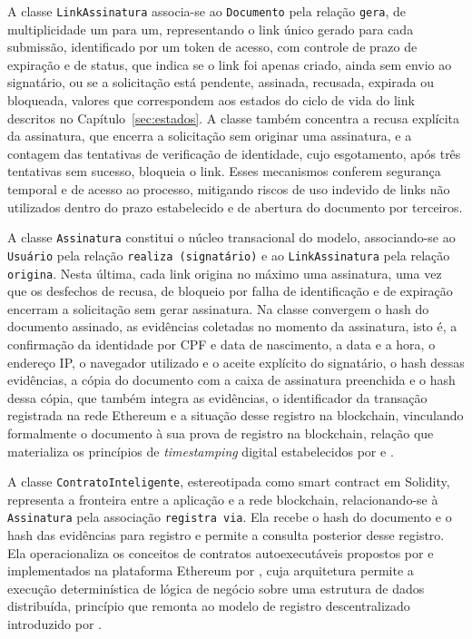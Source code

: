 \documentclass[
    12pt,
    a4paper,
    oneside,
    chapter=TITLE,
    section=TITLE,
    subsection=TITLE,
    subsubsection=TITLE,
    sumario=tradicional,
    english,
    brazil
]{abntex2}
\newcommand{\elem}[1]{\texttt{#1}}
\begin{document}
A classe \elem{LinkAssinatura} associa-se ao \elem{Documento} pela relação \elem{gera}, de multiplicidade um para um, representando o link único gerado para cada submissão, identificado por um token de acesso, com controle de prazo de expiração e de status, que indica se o link foi apenas criado, ainda sem envio ao signatário, ou se a solicitação está pendente, assinada, recusada, expirada ou bloqueada, valores que correspondem aos estados do ciclo de vida do link descritos no Capítulo~\ref{sec:estados}. A classe também concentra a recusa explícita da assinatura, que encerra a solicitação sem originar uma assinatura, e a contagem das tentativas de verificação de identidade, cujo esgotamento, após três tentativas sem sucesso, bloqueia o link. Esses mecanismos conferem segurança temporal e de acesso ao processo, mitigando riscos de uso indevido de links não utilizados dentro do prazo estabelecido e de abertura do documento por terceiros.

A classe \elem{Assinatura} constitui o núcleo transacional do modelo, associando-se ao \elem{Usuário} pela relação \elem{realiza (signatário)} e ao \elem{LinkAssinatura} pela relação \elem{origina}. Nesta última, cada link origina no máximo uma assinatura, uma vez que os desfechos de recusa, de bloqueio por falha de identificação e de expiração encerram a solicitação sem gerar assinatura. Na classe convergem o hash do documento assinado, as evidências coletadas no momento da assinatura, isto é, a confirmação da identidade por CPF e data de nascimento, a data e a hora, o endereço IP, o navegador utilizado e o aceite explícito do signatário, o hash dessas evidências, a cópia do documento com a caixa de assinatura preenchida e o hash dessa cópia, que também integra as evidências, o identificador da transação registrada na rede Ethereum e a situação desse registro na blockchain, vinculando formalmente o documento à sua prova de registro na blockchain, relação que materializa os princípios de \emph{timestamping} digital estabelecidos por  e .

A classe \elem{ContratoInteligente}, estereotipada como smart contract em Solidity, representa a fronteira entre a aplicação e a rede blockchain, relacionando-se à \elem{Assinatura} pela associação \elem{registra via}. Ela recebe o hash do documento e o hash das evidências para registro e permite a consulta posterior desse registro. Ela operacionaliza os conceitos de contratos autoexecutáveis propostos por  e implementados na plataforma Ethereum por , cuja arquitetura permite a execução determinística de lógica de negócio sobre uma estrutura de dados distribuída, princípio que remonta ao modelo de registro descentralizado introduzido por .
\end{document}
